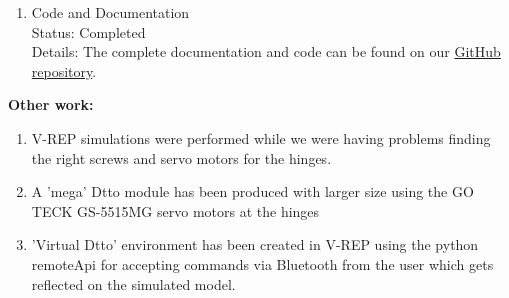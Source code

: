\documentclass[a4paper,12pt,oneside]{book}
\begin{document}
\begin{enumerate}
\item Code and Documentation
\\ Status: Completed
\\ Details: The complete documentation and code can be found on our \href{https://github.com/eYSIP-2017/eYSIP-2017_Modular-Robot}{GitHub repository}.

\end{enumerate}

\noindent \textbf{Other work:}

\begin{enumerate}
\item V-REP simulations were performed while we were having problems finding the right screws and servo motors for the hinges.

\item A 'mega' Dtto module has been produced with larger size using the GO TECK GS-5515MG servo motors at the hinges

\item 'Virtual Dtto' environment has been created in V-REP using the python remoteApi for accepting commands via Bluetooth from the user which gets reflected on the simulated model. 


\end{enumerate}

\pagebreak
\end{document}
